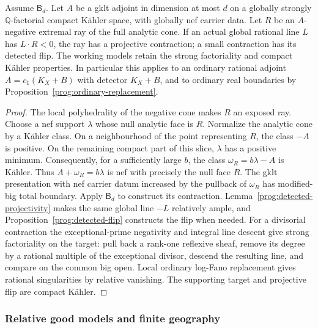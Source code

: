 \begin{proposition}
\label{prog:ordinary-step}
Assume $\mathsf B_d$. Let $A$ be a gklt adjoint in dimension at most
$d$ on a globally strongly $\mathbb Q$-factorial compact K\"ahler
space, with globally nef carrier data. Let $R$ be an $A$-negative
extremal ray of the full analytic cone. If an actual global rational
line $L$ has $L\cdot R<0$, the ray has a projective contraction;
a small contraction has its detected flip. The working models retain
the strong factoriality and compact K\"ahler properties.
In particular this applies to an ordinary rational adjoint
$A=c_1(K_X+B)$ with detector $K_X+B$, and to ordinary real boundaries
by Proposition~\ref{prog:ordinary-replacement}.
\end{proposition}
\begin{proof}
The local polyhedrality of the negative cone makes $R$ an exposed ray.
Choose a nef support $\lambda$ whose null analytic face is $R$.
Normalize the analytic cone by a K\"ahler class. On a neighbourhood
of the point representing $R$, the class $-A$ is positive. On the
remaining compact part of this slice, $\lambda$ has a positive
minimum. Consequently, for a sufficiently large $b$, the class
$\omega_R=b\lambda-A$ is K\"ahler. Thus
$A+\omega_R=b\lambda$ is nef with precisely the null face $R$.
The gklt presentation with nef carrier datum increased by the pullback
of $\omega_R$ has modified-big total boundary. Apply $\mathsf B_d$
to construct its contraction. Lemma~\ref{prog:detected-projectivity}
makes the same global line $-L$ relatively ample, and
Proposition~\ref{prog:detected-flip} constructs the flip when needed.
For a divisorial contraction the exceptional-prime negativity and
integral line descent give strong factoriality on the target: pull
back a rank-one reflexive sheaf, remove its degree by a rational
multiple of the exceptional divisor, descend the resulting line,
and compare on the common big open. Local ordinary log-Fano
replacement gives rational singularities by relative vanishing.
The supporting target and projective flip are compact K\"ahler.
\end{proof}

\subsubsection{Relative good models and finite geography}

